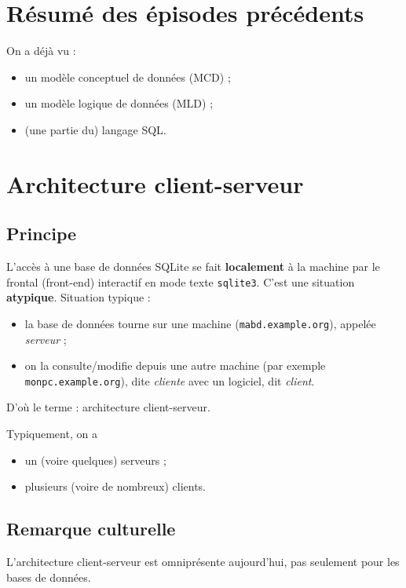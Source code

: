 \section{Résumé des épisodes précédents}

On a déjà vu :
\begin{itemize}
\item un modèle conceptuel de données (MCD) ;
\item un modèle logique de données (MLD) ;
\item (une partie du) langage SQL.
\end{itemize}


\section{Architecture client-serveur}
\subsection{Principe}

L'accès à une base de données SQLite se fait \textbf{localement} à la machine par le frontal (front-end)
  interactif en mode texte \texttt{sqlite3}.
  C'est une situation \textbf{atypique}.
Situation typique :
\begin{itemize}
\item la base de données tourne sur une machine
  (\texttt{mabd.example.org}), appelée \emph{serveur} ;
\item on la consulte/modifie depuis une autre machine
  (par exemple \texttt{monpc.example.org}), dite \emph{cliente} avec un
  logiciel, dit \emph{client}.
\end{itemize}

D'où le terme : architecture client-serveur.

Typiquement, on a 
\begin{itemize}
\item un (voire quelques) serveurs ;
\item plusieurs (voire de nombreux) clients.
\end{itemize}


\subsection{Remarque culturelle}
L'architecture client-serveur est omniprésente aujourd'hui,
pas seulement pour les bases de données.

